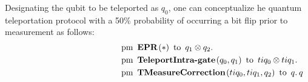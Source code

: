  Designating the qubit to be teleported as $q_0$, one can conceptualize he quantum teleportation protocol with a 50\% probability of occurring a bit flip prior to measurement as follows:
 \begin{align*}
     \hspace{130 pt}& \text{pm} \hspace{5pt} \textbf{EPR}\hspace{1pt} (*) \hspace{5pt} \text{to} \hspace{5pt}  q_{1} \otimes q_{2}.  \notag \\
     & \text{pm}\hspace{5pt} \textbf{TeleportIntra-gate} \hspace{1pt} (q_0,q_{1}) \hspace{5pt}  \text{to} \hspace{5pt} tiq_{0}\otimes tiq_{1} . \notag \\
     & \text{pm} \hspace{5pt}  \textbf{TMeasureCorrection} \hspace{1pt} ( tiq_{0},  tiq_{1}, q_{2} ) \hspace{5pt} \text{to} \hspace{5pt}  q. \hspace{2pt}  q
 \end{align*}